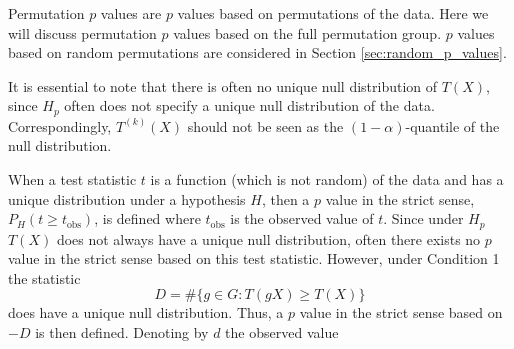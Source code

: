 \documentclass{article}
\begin{document}
Permutation $p$ values are $p$ values based on permutations of the data. Here we will discuss permutation $p$ values based on the full permutation group. $p$ values based on random permutations are considered in Section \ref{sec:random_p_values}.

It is essential to note that there is often no unique null distribution of $T(X)$, since $H_p$ often does not specify a unique null distribution of the data. Correspondingly, $T^{(k)}(X)$ should not be seen as the $(1 - \alpha)$-quantile of the null distribution.

When a test statistic $t$ is a function (which is not random) of the data and has a unique distribution under a hypothesis $H$, then a $p$ value in the strict sense, $P_H(t \geq t_\text{obs})$, is defined where $t_\text{obs}$ is the observed value of $t$. Since under $H_p$ $T(X)$ does not always have a unique null distribution, often there exists no $p$ value in the strict sense based on this test statistic. However, under Condition 1 the statistic
\[
D = \#\{g \in G : T(gX) \geq T(X)\}
\]
does have a unique null distribution. Thus, a $p$ value in the strict sense based on $-D$ is then defined. Denoting by $d$ the observed value
\end{document}
